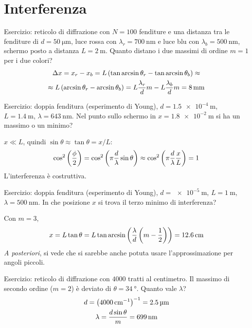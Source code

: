 \section{Interferenza}

Esercizio: reticolo di diffrazione con $N = 100$ fenditure e una distanza tra le fenditure di $d = \qty{50}{\micro\metre}$, luce rossa con $\lambda_r = \qty{700}{\nano\metre}$ e luce blu con $\lambda_b = \qty{500}{\nano\metre}$, schermo posto a distanza $L = \qty{2}{\metre}$.
Quanto distano i due massimi di ordine $m = 1$ per i due colori?
\begin{equation}
\begin{gathered}
    \Delta x = x_r - x_b = L \left( \tan \arcsin \theta_r - \tan \arcsin \theta_b \right) \approx \\
    \approx L \left( \arcsin \theta_r - \arcsin \theta_b \right)
    = L \frac{\lambda_r}{d} m - L \frac{\lambda_b}{d} m
    = \qty{8}{\milli\metre}
\end{gathered}
\end{equation}

Esercizio: doppia fenditura (esperimento di Young), $d = \qty{1.5e-4}{\metre}$, $L = \qty{1.4}{\metre}$, $\lambda = \qty{643}{\nano\metre}$.
Nel punto sullo schermo in $x = \qty{1.8e-2}{\metre}$ si ha un massimo o un minimo?

$x \ll L$, quindi $\sin \theta \approx \tan \theta = x/L$:
\begin{equation}
    \cos^2\left( \frac{\phi}{2} \right)
    = \cos^2\left( \pi \frac{d}{\lambda} \sin\theta \right)
    \approx \cos^2\left( \pi \frac{d}{\lambda} \frac{x}{L} \right) = 1
\end{equation}
L'interferenza è costruttiva.

Esercizio: doppia fenditura (esperimento di Young), $d = \qty{e-5}{\metre}$, $L = \qty{1}{\metre}$, $\lambda = \qty{500}{\nano\metre}$.
In che posizione $x$ si trova il terzo minimo di interferenza?

Con $m = 3$,
\begin{equation}
    x = L \tan \theta
    = L \tan \arcsin \left( \frac{\lambda}{d} \left( m - \frac{1}{2} \right) \right)
    = \qty{12.6}{\centi\metre}
\end{equation}
\textit{A posteriori}, si vede che si sarebbe anche potuta usare l'approssimazione per angoli piccoli.

Esercizio: reticolo di diffrazione con $4000$ tratti al centimetro.
Il massimo di secondo ordine ($m = 2$) è deviato di $\theta = \qty{34}{\degree}$.
Quanto vale $\lambda$?
\begin{gather}
    d = \left( \qty{4000}{\per\centi\meter} \right)^{-1} = \qty{2.5}{\micro\metre} \\
    \lambda = \frac{d \sin{\theta}}{m} = \qty{699}{\nano\metre}
\end{gather}

